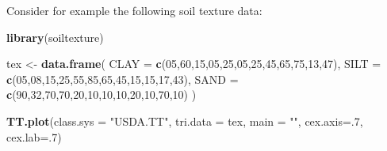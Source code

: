 \documentclass[10pt,b5paper,]{book}
\newenvironment{Shaded}{\begin{snugshade}}{\end{snugshade}}
\newcommand{\DataTypeTok}[1]{\textcolor[rgb]{0.13,0.29,0.53}{#1}}
\newcommand{\DecValTok}[1]{\textcolor[rgb]{0.00,0.00,0.81}{#1}}
\newcommand{\KeywordTok}[1]{\textcolor[rgb]{0.13,0.29,0.53}{\textbf{#1}}}
\newcommand{\NormalTok}[1]{#1}
\newcommand{\StringTok}[1]{\textcolor[rgb]{0.31,0.60,0.02}{#1}}
\theoremstyle{definition}
\theoremstyle{definition}
\theoremstyle{definition}
\theoremstyle{remark}
\begin{document}
Consider for example the following soil texture data:

\begin{Shaded}
\begin{Highlighting}[]
\KeywordTok{library}\NormalTok{(soiltexture)}

\NormalTok{tex <-}\StringTok{ }\KeywordTok{data.frame}\NormalTok{(}
  \DataTypeTok{CLAY =} \KeywordTok{c}\NormalTok{(}\DecValTok{05}\NormalTok{,}\DecValTok{60}\NormalTok{,}\DecValTok{15}\NormalTok{,}\DecValTok{05}\NormalTok{,}\DecValTok{25}\NormalTok{,}\DecValTok{05}\NormalTok{,}\DecValTok{25}\NormalTok{,}\DecValTok{45}\NormalTok{,}\DecValTok{65}\NormalTok{,}\DecValTok{75}\NormalTok{,}\DecValTok{13}\NormalTok{,}\DecValTok{47}\NormalTok{),}
  \DataTypeTok{SILT =} \KeywordTok{c}\NormalTok{(}\DecValTok{05}\NormalTok{,}\DecValTok{08}\NormalTok{,}\DecValTok{15}\NormalTok{,}\DecValTok{25}\NormalTok{,}\DecValTok{55}\NormalTok{,}\DecValTok{85}\NormalTok{,}\DecValTok{65}\NormalTok{,}\DecValTok{45}\NormalTok{,}\DecValTok{15}\NormalTok{,}\DecValTok{15}\NormalTok{,}\DecValTok{17}\NormalTok{,}\DecValTok{43}\NormalTok{),}
  \DataTypeTok{SAND =} \KeywordTok{c}\NormalTok{(}\DecValTok{90}\NormalTok{,}\DecValTok{32}\NormalTok{,}\DecValTok{70}\NormalTok{,}\DecValTok{70}\NormalTok{,}\DecValTok{20}\NormalTok{,}\DecValTok{10}\NormalTok{,}\DecValTok{10}\NormalTok{,}\DecValTok{10}\NormalTok{,}\DecValTok{20}\NormalTok{,}\DecValTok{10}\NormalTok{,}\DecValTok{70}\NormalTok{,}\DecValTok{10}\NormalTok{)}
\NormalTok{ )}
 
\KeywordTok{TT.plot}\NormalTok{(}\DataTypeTok{class.sys =} \StringTok{"USDA.TT"}\NormalTok{, }\DataTypeTok{tri.data =}\NormalTok{ tex, }\DataTypeTok{main =} \StringTok{""}\NormalTok{, }
        \DataTypeTok{cex.axis=}\NormalTok{.}\DecValTok{7}\NormalTok{, }\DataTypeTok{cex.lab=}\NormalTok{.}\DecValTok{7}\NormalTok{)}
\end{Highlighting}
\end{Shaded}
\end{document}
